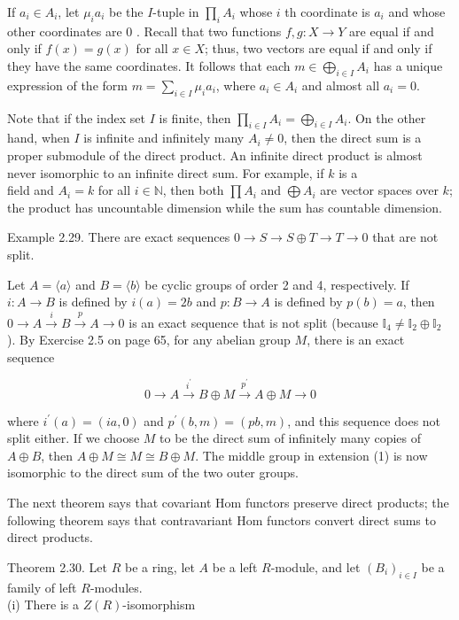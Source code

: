 \documentclass[10pt]{article}
\begin{document}
If $a_{i} \in A_{i}$, let $\mu_{i} a_{i}$ be the $I$-tuple in $\prod_{i} A_{i}$ whose $i$ th coordinate is $a_{i}$ and whose other coordinates are 0 . Recall that two functions $f, g: X \rightarrow Y$ are equal if and only if $f(x)=g(x)$ for all $x \in X$; thus, two vectors are equal if and only if they have the same coordinates. It follows that each $m \in \bigoplus_{i \in I} A_{i}$ has a unique expression of the form $m=\sum_{i \in I} \mu_{i} a_{i}$, where $a_{i} \in A_{i}$ and almost all $a_{i}=0$.

Note that if the index set $I$ is finite, then $\prod_{i \in I} A_{i}=\bigoplus_{i \in I} A_{i}$. On the other hand, when $I$ is infinite and infinitely many $A_{i} \neq 0$, then the direct sum is a proper submodule of the direct product. An infinite direct product is almost never isomorphic to an infinite direct sum. For example, if $k$ is a\\
field and $A_{i}=k$ for all $i \in \mathbb{N}$, then both $\prod A_{i}$ and $\bigoplus A_{i}$ are vector spaces over $k$; the product has uncountable dimension while the sum has countable dimension.

Example 2.29. There are exact sequences $0 \rightarrow S \rightarrow S \oplus T \rightarrow T \rightarrow 0$ that are not split.

Let $A=\langle a\rangle$ and $B=\langle b\rangle$ be cyclic groups of order 2 and 4, respectively. If $i: A \rightarrow B$ is defined by $i(a)=2 b$ and $p: B \rightarrow A$ is defined by $p(b)=a$, then $0 \rightarrow A \xrightarrow{i} B \xrightarrow{p} A \rightarrow 0$ is an exact sequence that is not split (because $\mathbb{I}_{4} \neq \mathbb{I}_{2} \oplus \mathbb{I}_{2}$ ). By Exercise 2.5 on page 65, for any abelian group $M$, there is an exact sequence

$$
0 \rightarrow A \xrightarrow{i^{\prime}} B \oplus M \xrightarrow{p^{\prime}} A \oplus M \rightarrow 0
$$

where $i^{\prime}(a)=(i a, 0)$ and $p^{\prime}(b, m)=(p b, m)$, and this sequence does not split either. If we choose $M$ to be the direct sum of infinitely many copies of $A \oplus B$, then $A \oplus M \cong M \cong B \oplus M$. The middle group in extension (1) is now isomorphic to the direct sum of the two outer groups.

The next theorem says that covariant Hom functors preserve direct products; the following theorem says that contravariant Hom functors convert direct sums to direct products.

Theorem 2.30. Let $R$ be a ring, let $A$ be a left $R$-module, and let $\left(B_{i}\right)_{i \in I}$ be a family of left $R$-modules.\\
(i) There is a $Z(R)$-isomorphism
\end{document}
